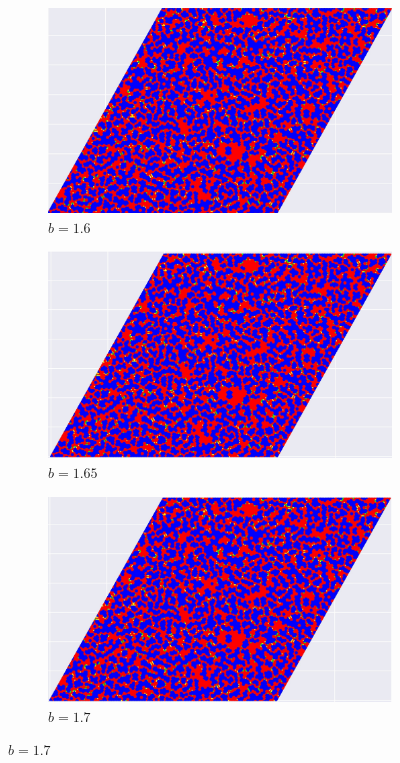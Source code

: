 \documentclass[12pt]{article}
\begin{document}
\begin{figure}[!htbp]
            \begin{subfigure}{.33\textwidth}
            \centering
            \includegraphics[width=.9\linewidth]{TriangularMeanFieldGame/triangular_snapshot_b=16.jpg}
            \caption{$b=1.6$}
            \label{fig:trsub4}
            \end{subfigure}%
            \begin{subfigure}{.33\textwidth}
            \centering
            \includegraphics[width=.9\linewidth]{TriangularMeanFieldGame/triangular_snapshot_b=165.jpg}
            \caption{$b=1.65$}
            \label{fig:trsub5}
            \end{subfigure}%
            \begin{subfigure}{.33\textwidth}
            \centering
            \includegraphics[width=.9\linewidth]{TriangularMeanFieldGame/triangular_snapshot_b=17.jpg}
            \caption{$b=1.7$}
            \label{fig:trsub6}
            \end{subfigure}
            

\end{figure}
\end{document}
